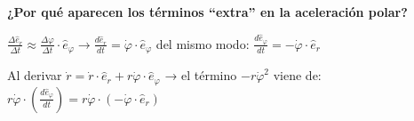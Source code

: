\documentclass[12pt]{article}
\begin{document}
\thispagestyle{empty}
\setlength{\parindent}{0pt}
\centering

{\Large\bfseries ¿Por qué aparecen los términos ``extra'' en la aceleración polar?}

\vspace{0.5em}

$\frac{\Delta\hat{e}_r}{\Delta t} \approx \frac{\Delta\varphi}{\Delta t}\cdot\hat{e}_\varphi \rightarrow \frac{d\hat{e}_r}{dt} = \dot{\varphi}\cdot\hat{e}_\varphi$ del mismo modo: $\frac{d\hat{e}_\varphi}{dt} = -\dot{\varphi}\cdot\hat{e}_r$

\vspace{0.3em}

Al derivar $\dot{r} = \dot{r}\cdot\hat{e}_r + r\dot{\varphi}\cdot\hat{e}_\varphi$ → el término $-r\dot{\varphi}^2$ viene de: $r\dot{\varphi}\cdot\left(\frac{d\hat{e}_\varphi}{dt}\right) = r\dot{\varphi}\cdot(-\dot{\varphi}\cdot\hat{e}_r)$
\end{document}
